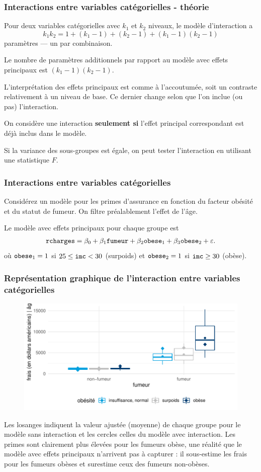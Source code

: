\documentclass[xcolor={dvipsnames}]{beamer}
\begin{document}
\begin{frame}
\frametitle{Interactions entre variables catégorielles - théorie}
\bi
\item Pour deux variables catégorielles avec  $k_1$ et $k_2$ niveaux, le modèle d'interaction a \[k_1k_2 = 1+ (k_1-1) + (k_2-1) + (k_1-1)(k_2-1)\] paramètres --- un par combinaison.
\item Le nombre de paramètres additionnels par rapport au modèle avec effets principaux est $(k_1-1)(k_2-1)$.
\item L'interprétation des effets principaux est comme à l'accoutumée, soit un contraste relativement à un niveau de base. Ce dernier change selon que l'on inclue (ou pas) l'interaction.
\item On considère une interaction \textbf{seulement si} l'effet principal correspondant est déjà inclus dans le modèle.
\item Si la variance des sous-groupes est égale, on peut tester l'interaction en utilisant une statistique $F$.
\ei
\end{frame}
\begin{frame}[fragile]
 \frametitle{Interactions entre variables catégorielles}
 \bi 
 \item Considérez un modèle pour les primes d'assurance en fonction du facteur obésité et du statut de fumeur. On filtre préalablement l'effet de l'âge.
 \item Le modèle avec effets principaux pour chaque groupe est
\begin{align*}
\texttt{rcharges} = \beta_0 + \beta_1 \texttt{fumeur} + \beta_2 \texttt{obese}_1 +  \beta_3 \texttt{obese}_2 + \varepsilon. 
\end{align*}
où $\texttt{obese}_1=1$ si $25\leq \texttt{imc} < 30$ (surpoids) et $\texttt{obese}_2=1$ si $\texttt{imc} \geq 30$ (obèse).
\ei

\end{frame}
\begin{frame}[fragile]
 \frametitle{Représentation graphique de l'interaction entre variables catégorielles}
\begin{figure}
 \centering
 \includegraphics[width = 0.8\linewidth]{img/c2/03-linreg-interaction_categ_fr.pdf}
\end{figure} 
{\tiny 
Les losanges indiquent la valeur ajustée (moyenne) de chaque groupe pour le modèle sans interaction et les cercles celles du modèle avec interaction. Les primes sont clairement plus élevées pour les fumeurs obèse, une réalité que le modèle avec effets principaux n'arrivent pas à capturer : il sous-estime les frais pour les fumeurs obèses et surestime ceux des fumeurs non-obèses.  \par
}
\end{frame}
\end{document}
